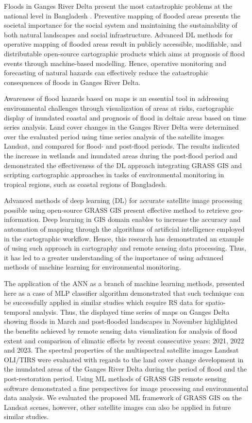 \documentclass[water,article,submit,pdftex,moreauthors]{Definitions/mdpi}
\begin{document}
Floods in Ganges River Delta present the most catastrophic problems at the national level in Bangladesh \cite{Szabo}. Preventive mapping of flooded areas presents the societal importance for the social system and maintaining the sustainability of both natural landscapes and social infrastructure. Advanced DL methods for operative mapping of flooded areas result in publicly accessible, modifiable, and distributable open-source cartographic products which aims at prognosis of flood events through machine-based modelling. Hence, operative monitoring and forecasting of natural hazards can effectively reduce the catastrophic consequences of floods in Ganges River Delta. 

Awareness of flood hazards based on maps is an essential tool in addressing environmental challenges through visualization of areas at risks, cartographic display of inundated coastal and prognosis of flood in deltaic areas based on time series analysis. Land cover changes in the Ganges River Delta were determined over the evaluated period using time series analysis of the satellite images Landsat, and compared for flood- and post-flood periods. The results indicated the increase in wetlands and inundated areas during the post-flood period and demonstrated the effectiveness of the DL approach integrating GRASS GIS and scripting cartographic approaches in tasks of environmental monitoring in tropical regions, such as coastal regions of Bangladesh. 

Advanced methods of deep learning (DL) for accurate satellite image processing possible using open-source GRASS GIS present effective method to retrieve geo-information. Deep learning in GIS domain enables to increase the accuracy and automation of mapping through the algorithms of artificial intelligence employed in the cartographic workflow. Hence, this research has demonstrated an example of using such approach in cartography and remote sensing data processing. Thus, it has led to a greater understanding of the importance of using advanced methods of machine learning for environmental monitoring. 

The application of the ANN as a branch of machine learning methods, presented here as a case of MLP classifier algorithm demonstrated that such technique can be successfully applied in similar studies which require RS data for spatio-temporal analysis. Thus, the displayed time series of maps on Ganges Delta showing floods in March and post-flooded landscapes in November highlighted the benefits achieved by remote sensing data visualization for analysis of flood extent and comparison of climatic effects by recent consecutive years: 2021, 2022 and 2023. The spectral properties of the multispectral satellite images Landsat OLI/TIRS  were evaluated with regards to the land cover change development in the inundated areas of the Ganges River Delta during the period of flood and the post-restoration period. Using ML methods of GRASS GIS remote sensing software demonstrated a fine perspectives for image processing and environmental data analysis. We evaluated the proposed ML framework of GRASS GIS on the Landsat scenes, however, other satellite images can also be applied in future similar studies.
\end{document}
